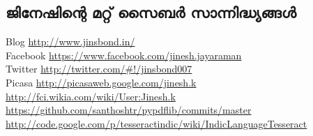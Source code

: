 \subsection*{ജിനേഷിന്റെ മറ്റ് സൈബര്‍ സാന്നിദ്ധ്യങ്ങള്‍}
Blog \url{http://www.jinsbond.in/} \\
Facebook \url{https://www.facebook.com/jinesh.jayaraman} \\
Twitter \url{http://twitter.com/#!/jinsbond007} \\
Picasa \url{http://picasaweb.google.com/jinesh.k} \\
\url{http://fci.wikia.com/wiki/User:Jinesh.k} \\
\url{https://github.com/santhoshtr/pypdflib/commits/master} \\
\url{http://code.google.com/p/tesseractindic/wiki/IndicLanguageTesseract}

\newpage
